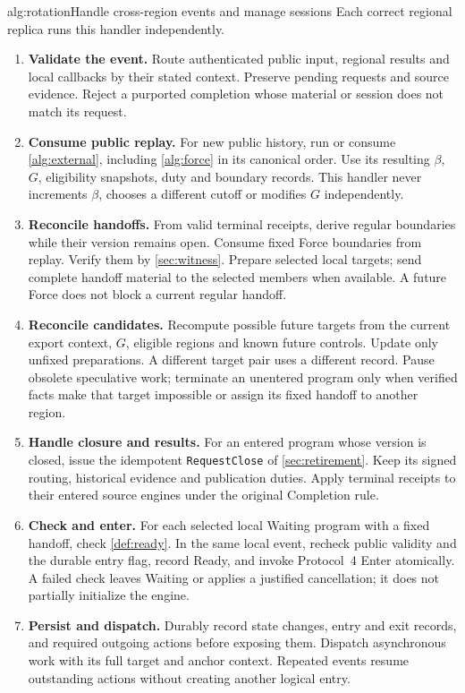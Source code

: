 \begin{protocol}[H]{alg:rotation}{Handle cross-region events and manage sessions}
Each correct regional replica runs this handler independently.
\begin{enumerate}[label=\textbf{\arabic*)},itemsep=3pt]
\item \textbf{Validate the event.} Route authenticated public input,
regional results and local callbacks by their stated context. Preserve
pending requests and source evidence. Reject a purported completion
whose material or session does not match its request.
\item \textbf{Consume public replay.} For new public history, run or
consume \cref{alg:external}, including \cref{alg:force} in its canonical
order. Use its resulting $\beta$, $G$, eligibility snapshots, duty and
boundary records. This handler never increments $\beta$, chooses a
different cutoff or modifies $G$ independently.
\item \textbf{Reconcile handoffs.} From valid terminal receipts,
derive regular boundaries while their version remains open. Consume
fixed Force boundaries from replay. Verify them by
\cref{sec:witness}. Prepare selected local targets; send complete
handoff material to the selected members when available. A future
Force does not block a current regular handoff.
\item \textbf{Reconcile candidates.} Recompute possible future
targets from the current export context, $G$, eligible regions and
known future controls. Update only unfixed preparations. A different
target pair uses a different record. Pause obsolete speculative work;
terminate an unentered program only when verified facts make that
target impossible or assign its fixed handoff to another region.
\item \textbf{Handle closure and results.} For an entered program
whose version is closed, issue the idempotent \texttt{RequestClose}
of \cref{sec:retirement}. Keep its signed routing, historical evidence
and publication duties. Apply terminal receipts to their entered
source engines under the original Completion rule.
\item \textbf{Check and enter.} For each selected local Waiting
program with a fixed handoff, check \cref{def:ready}. In the same local
event, recheck public validity and the durable entry flag, record Ready,
and invoke Protocol~4 Enter atomically. A failed check leaves Waiting
or applies a justified cancellation; it does not partially initialize
the engine.
\item \textbf{Persist and dispatch.} Durably record state changes,
entry and exit records, and required outgoing actions before exposing
them. Dispatch asynchronous work with its full target and anchor
context. Repeated events resume outstanding actions without creating
another logical entry.
\end{enumerate}
\end{protocol}

